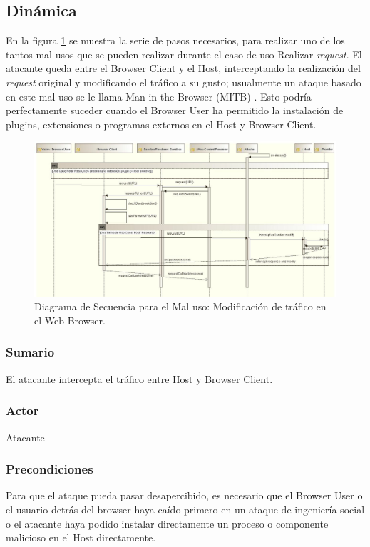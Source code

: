 \subsection{Dinámica}
En la figura \ref{fig:SeqMisuse} se muestra la serie de pasos necesarios, para realizar uno de los tantos mal usos que se pueden realizar durante el caso de uso Realizar \textit{request}. El atacante queda entre el Browser Client y el Host, interceptando la realización del \textit{request} original y modificando el tráfico a su gusto; usualmente un ataque basado en este mal uso se le llama Man-in-the-Browser (MITB) \cite{Liu2012, Barth2010, Utakrit2009, Dougan2012}. Esto podría perfectamente suceder cuando el Browser User ha permitido la instalación de plugins, extensiones o programas externos en el Host y Browser Client.
\begin{landscape}
\begin{figure}[h!t]
	        \centering
	        \includegraphics[scale=0.66]{figures/chap5/patronMisuseSeq_v2.jpg}
	        \caption{Diagrama de Secuencia para el Mal uso: Modificación de tráfico en el Web Browser.}
	        \label{fig:SeqMisuse}
    \end{figure}
\end{landscape}
	
	\subsubsection{Sumario} El atacante intercepta el tráfico entre Host y Browser Client.
	\subsubsection{Actor} Atacante
	\subsubsection{Precondiciones} Para que el ataque pueda pasar desapercibido, es necesario que el Browser User o el usuario detrás del browser haya caído primero en un ataque de ingeniería social o el atacante haya podido instalar directamente un proceso o componente malicioso en el Host directamente.
